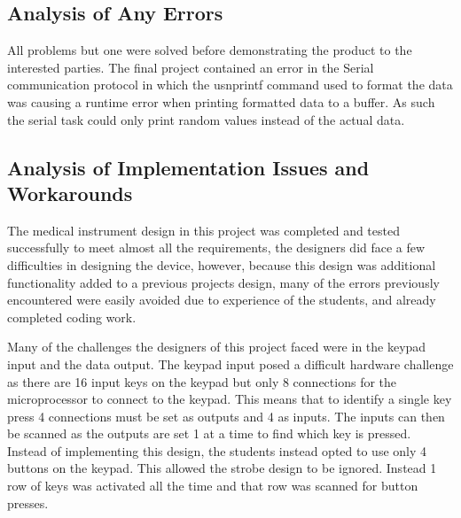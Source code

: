 \documentclass[12pt]{article} %
\begin{document}
    \subsection{Analysis of Any Errors}
   All problems but one were solved before demonstrating the product to the interested
	parties. The final project contained an error in the Serial communication protocol in which the usnprintf command used to format the data was causing a runtime error when printing formatted data to a buffer. As such the serial task could only print random values instead of the actual data.

    \subsection{Analysis of Implementation Issues and Workarounds}



  The medical instrument design in this project was completed and tested
    successfully to meet almost all the requirements, the designers did face a few difficulties in designing the device, however, because this design was additional functionality added to a previous projects design, many of the errors previously encountered were easily avoided due to experience of the students, and already completed coding work.
    
    
    Many of the challenges the designers of this project faced were in the keypad input and the data output. The keypad input posed a difficult hardware challenge as there are 16 input keys on the keypad but only 8 connections for the microprocessor to connect to the keypad. This means that to identify a single key press 4 connections must be set as outputs and 4 as inputs. The inputs can then be scanned as the outputs are set 1 at a time to find which key is pressed. Instead of implementing this design, the students instead opted to use only 4 buttons on the keypad. This allowed the strobe design to be ignored. Instead 1 row of keys was activated all the time and that row was scanned for button presses.
    
\end{document}
